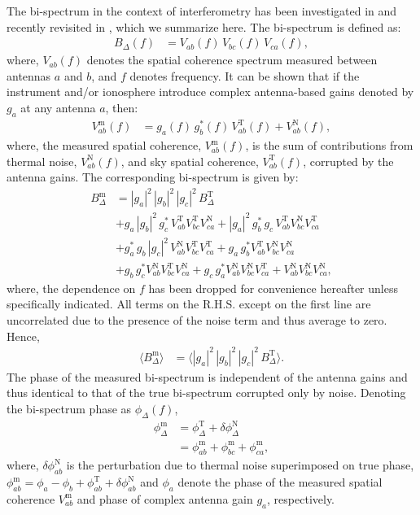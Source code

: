 \documentclass[
reprint,
superscriptaddress,
amsmath,
amssymb,
aps,
prd
]{revtex4-1}
\begin{document}
The bi-spectrum in the context of interferometry has been investigated in \cite{jen58,kul89,tay99,tho01} and recently revisited in \cite{car18}, which we summarize here. The bi-spectrum is defined as:
\begin{align}
  B_\Delta(f) &= V_{ab}(f)\,V_{bc}(f)\,V_{ca}(f),
\end{align}
where, $V_{ab}(f)$ denotes the spatial coherence spectrum measured between antennas $a$ and $b$, and $f$ denotes frequency. It can be shown that if the instrument and/or ionosphere introduce complex antenna-based gains denoted by $g_a$ at any antenna $a$, then: 
\begin{align}
  V_{ab}^\textrm{m}(f) &= g_a(f)\, g_b^*(f)\, V_{ab}^\textrm{T}(f) + V_{ab}^\textrm{N}(f),
\end{align}
where, the measured spatial coherence, $V_{ab}^\textrm{m}(f)$, is the sum of contributions from thermal noise, $V_{ab}^\textrm{N}(f)$, and sky spatial coherence, $V_{ab}^\textrm{T}(f)$, corrupted by the antenna gains. The corresponding bi-spectrum is given by:
\begin{align}\label{eqn:bispectrum-terms}
  B_\Delta^\textrm{m} &= |g_a|^2\, |g_b|^2\, |g_c|^2\, B_\Delta^\textrm{T} \\
  &+ g_a\,|g_b|^2\,g_c^*\,V_{ab}^\textrm{T}V_{bc}^\textrm{T}V_{ca}^\textrm{N} + |g_a|^2\,g_b^*\,g_c\,V_{ab}^\textrm{T}V_{bc}^\textrm{N}V_{ca}^\textrm{T} \nonumber \\
  &+ g_a^*\,g_b\,|g_c|^2\,V_{ab}^\textrm{N}V_{bc}^\textrm{T}V_{ca}^\textrm{T} + g_a\,g_b^*V_{ab}^\textrm{T}V_{bc}^\textrm{N}V_{ca}^\textrm{N} \nonumber \\
  &+ g_b\,g_c^*V_{ab}^\textrm{N}V_{bc}^\textrm{T}V_{ca}^\textrm{N} + g_c\,g_a^*V_{ab}^\textrm{N}V_{bc}^\textrm{N}V_{ca}^\textrm{T} + V_{ab}^\textrm{N}V_{bc}^\textrm{N}V_{ca}^\textrm{N}, \nonumber 
\end{align}
where, the dependence on $f$ has been dropped for convenience hereafter unless specifically indicated. All terms on the R.H.S. except on the first line are uncorrelated due to the presence of the noise term and thus average to zero. Hence, 
\begin{align}
  \langle B_\Delta^\textrm{m}\rangle &= \langle |g_a|^2\, |g_b|^2\, |g_c|^2\, B_\Delta^\textrm{T}\rangle. \label{eqn:closure-asymptotic}
\end{align}
The phase of the measured bi-spectrum is independent of the antenna gains and thus identical to that of the true bi-spectrum corrupted only by noise. Denoting the bi-spectrum phase as $\phi_\Delta(f)$, 
\begin{align}
  \phi_\Delta^\textrm{m} &= \phi_\Delta^\textrm{T} + \delta\phi_\Delta^\textrm{N} \label{eqn:cpphase-sum-sky-noise} \\
  &= \phi_{ab}^\textrm{m} + \phi_{bc}^\textrm{m} + \phi_{ca}^\textrm{m} \label{eqn:cpphase-sum-of-visphases},
\end{align}
where, $\delta\phi_{ab}^\textrm{N}$ is the perturbation due to thermal noise superimposed on true phase, $\phi_{ab}^\textrm{m} = \phi_a - \phi_b + \phi_{ab}^\textrm{T} + \delta\phi_{ab}^\textrm{N}$ and $\phi_a$ denote the phase of the measured spatial coherence $V_{ab}^\textrm{m}$ and phase of complex antenna gain $g_a$, respectively. 
\end{document}
